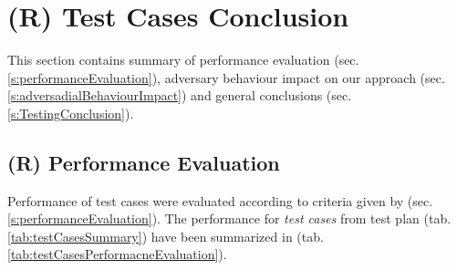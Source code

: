 \section{(R) Test Cases Conclusion}\label{s:testCasesConclusion}
\noindent This section contains summary of performance evaluation (sec. \ref{s:performanceEvaluation}), adversary behaviour impact on our approach (sec. \ref{s:adversadialBehaviourImpact}) and general conclusions (sec. \ref{s:TestingConclusion}).

\subsection{(R) Performance Evaluation}\label{s:performanceEvaluationTable}
\noindent Performance of test cases were evaluated according to criteria given by (sec. \ref{s:performanceEvaluation}). The performance for \emph{test cases} from test plan (tab. \ref{tab:testCasesSummary}) have been summarized in (tab. \ref{tab:testCasesPerformacneEvaluation}).


